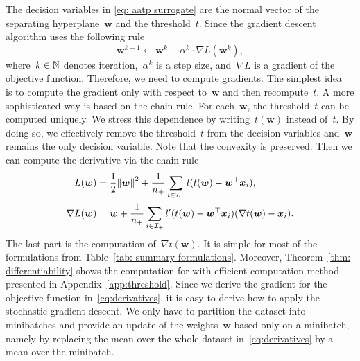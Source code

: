 The decision variables in \eqref{eq: aatp surrogate} are the normal vector of the separating hyperplane~$\bm{w}$ and the threshold~$t$. Since the gradient descent algorithm uses the following rule
\begin{equation*}
  \bm{w}^{k+1} \gets \bm{w}^k - \alpha^k \cdot \nabla L(\bm{w}^k),
\end{equation*}
where~$k \in \mathbb{N}$ denotes iteration,~$\alpha^k$ is a step size, and~$\nabla L$ is a gradient of the objective function. Therefore, we need to compute gradients. The simplest idea~\cite{grill2016learning} is to compute the gradient only with respect to~$\bm{w}$ and then recompute~$t$. A more sophisticated way is based on the chain rule. For each~$\bm{w}$, the threshold~$t$ can be computed uniquely. We stress this dependence by writing~$t(\bm{w})$ instead of~$t$. By doing so, we effectively remove the threshold~$t$ from the decision variables and~$\bm{w}$ remains the only decision variable. Note that the convexity is preserved. Then we can compute the derivative via the chain rule
\begin{equation}\label{eq:derivatives}
  \begin{aligned}
  L(\bm{w})
    & = \frac{1}{2}\norm{\bm{w}}^2 + \frac{1}{\npos} \sum_{i \in \Ipos} l(t(\bm{w}) - \bm{w}^{\top} \bm{x}_i) , \\
  \nabla L(\bm{w})
    & = \bm{w} + \frac{1}{\npos} \sum_{i \in \Ipos} l'(t(\bm{w}) - \bm{w}^{\top} \bm{x}_i)(\nabla t(\bm{w}) - \bm{x}_i).
  \end{aligned}
\end{equation}
The last part is the computation of~$\nabla t(\bm{w})$. It is simple for most of the formulations from Table~\ref{tab: summary formulations}. Moreover, Theorem~\ref{thm: differentiability} shows the computation for \PatMat with efficient computation method presented in Appendix~\ref{app:threshold}. Since we derive the gradient for the objective function in~\eqref{eq:derivatives}, it is easy to derive how to apply the stochastic gradient descent. We only have to partition the dataset into minibatches and provide an update of the weights~$\bm{w}$ based only on a minibatch, namely by replacing the mean over the whole dataset in~\eqref{eq:derivatives} by a mean over the minibatch.

